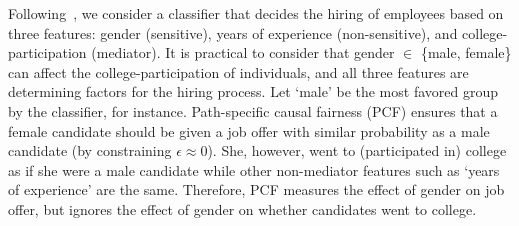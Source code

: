 		
		\begin{example}
			Following~\cite{bastani2019probabilistic}, we consider a classifier that decides the hiring of employees based on three features: gender (sensitive), years of experience (non-sensitive), and college-participation (mediator). It is practical to consider that gender $ \in $ \{male, female\} can affect the college-participation of individuals, and all three features are determining factors for the hiring process. Let `male' be the most favored group by the classifier, for instance. Path-specific causal fairness (PCF) ensures that a female candidate should be given a job offer with similar probability as a male candidate (by constraining $ \epsilon \approx 0 $). She,  however,  went to (participated in) college as if she were a male candidate while other non-mediator features such as  `years of experience' are the same.  Therefore, PCF measures the effect of gender on job offer, but ignores the effect of gender on whether candidates went to college.
		\end{example}	
		
	
